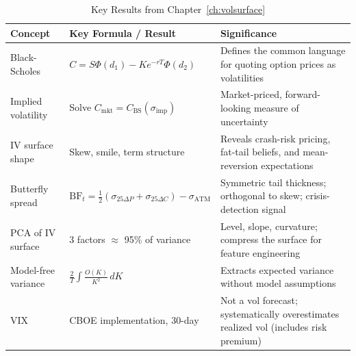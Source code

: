 \begin{table}[htbp]
\centering
\caption{Key Results from Chapter~\ref{ch:volsurface}}
\label{tab:ch8-key-results}
\begin{tabular}{p{3.5cm} p{4cm} p{5cm}}
\toprule
\textbf{Concept} & \textbf{Key Formula / Result} & \textbf{Significance} \\
\midrule
Black-Scholes & $C = S\Phi(d_1) - Ke^{-rT}\Phi(d_2)$ & Defines the common language for quoting option prices as volatilities \\
\addlinespace
Implied volatility & Solve $C_{\text{mkt}} = C_{\text{BS}}(\sigma_{\text{imp}})$ & Market-priced, forward-looking measure of uncertainty \\
\addlinespace
IV surface shape & Skew, smile, term structure & Reveals crash-risk pricing, fat-tail beliefs, and mean-reversion expectations \\
\addlinespace
Butterfly spread & $\mathrm{BF}_t = \frac{1}{2}(\sigma_{25\Delta P} + \sigma_{25\Delta C}) - \sigma_{\mathrm{ATM}}$ & Symmetric tail thickness; orthogonal to skew; crisis-detection signal \\
\addlinespace
PCA of IV surface & 3 factors $\approx$ 95\% of variance & Level, slope, curvature; compress the surface for feature engineering \\
\addlinespace
Model-free variance & $\frac{2}{T}\int \frac{O(K)}{K^2}\,dK$ & Extracts expected variance without model assumptions \\
\addlinespace
VIX & CBOE implementation, 30-day & Not a vol forecast; systematically overestimates realized vol (includes risk premium) \\
\bottomrule
\end{tabular}
\end{table}
